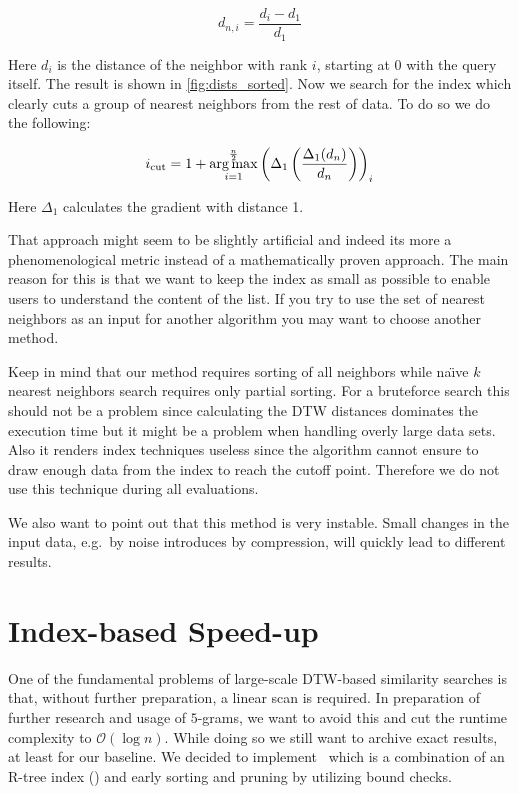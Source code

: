 \begin{equation}\label{eq:dists_norm}
    d_{n,i} = \frac{d_i - d_1}{d_1}
\end{equation}

Here $d_i$ is the distance of the neighbor with rank $i$, starting at \num{0} with the query itself. The result is shown in \autoref{fig:dists_sorted}. Now we search for the index which clearly cuts a group of nearest neighbors from the rest of data. To do so we do the following:

\begin{equation}\label{eq:dists_cut}
    i_\text{cut} = 1 + \operatorname*{arg\,max}_{i=1}^\frac{n}{2} \left( \Delta_1 \left( \frac{\Delta_1(d_n)}{d_n} \right) \right)_i
\end{equation}

Here $\Delta_1$ calculates the gradient with distance \num{1}.

That approach might seem to be slightly artificial and indeed its more a phenomenological metric instead of a mathematically proven approach. The main reason for this is that we want to keep the index as small as possible to enable users to understand the content of the list. If you try to use the set of nearest neighbors as an input for another algorithm you may want to choose another method.

Keep in mind that our method requires sorting of all neighbors while na{\"\i}ve $k$ nearest neighbors search requires only partial sorting. For a bruteforce search this should not be a problem since calculating the DTW distances dominates the execution time but it might be a problem when handling overly large data sets. Also it renders index techniques useless since the algorithm cannot ensure to draw enough data from the index to reach the cutoff point. Therefore we do not use this technique during all evaluations.

We also want to point out that this method is very instable. Small changes in the input data, e.g.\ by noise introduces by compression, will quickly lead to different results.



\section{Index-based Speed-up}
\label{sec:baseline:speed}

One of the fundamental problems of large-scale DTW-based similarity searches is that, without further preparation, a linear scan is required. In preparation of further research and usage of $5$-grams, we want to avoid this and cut the runtime complexity to $\mathcal{O}(\log{n})$. While doing so we still want to archive exact results, at least for our baseline. We decided to implement~\cite{LB_Keogh} which is a combination of an R-tree index (\cite{rtree}) and early sorting and pruning by utilizing bound checks.

